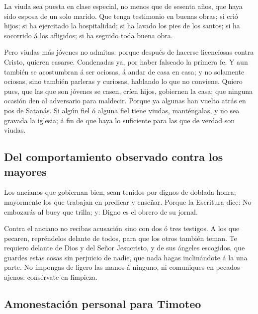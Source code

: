  La viuda sea puesta en clase especial, no menos que de
sesenta años, que haya sido esposa de un solo marido. 
Que tenga testimonio en buenas obras; si crió hijos; si ha ejercitado la
hospitalidad; si ha lavado los pies de los santos; si ha socorrido á los
afligidos; si ha seguido toda buena obra.

 Pero viudas más jóvenes no admitas: porque después de
hacerse licenciosas contra Cristo, quieren casarse. 
Condenadas ya, por haber falseado la primera fe.  Y aun
también se acostumbran á ser ociosas, á andar de casa en casa; y no
solamente ociosas, sino también parleras y curiosas, hablando lo que no
conviene.  Quiero pues, que las que son jóvenes se casen,
críen hijos, gobiernen la casa; que ninguna ocasión den al adversario
para maldecir.  Porque ya algunas han vuelto atrás en pos
de Satanás.  Si algún fiel ó alguna fiel tiene viudas,
manténgalas, y no sea gravada la iglesia; á fin de que haya lo
suficiente para las que de verdad son viudas.

\hypertarget{del-comportamiento-observado-contra-los-mayores}{%
\subsection{Del comportamiento observado contra los
mayores}\label{del-comportamiento-observado-contra-los-mayores}}

 Los ancianos que gobiernan bien, sean tenidos por dignos
de doblada honra; mayormente los que trabajan en predicar y enseñar.
 Porque la Escritura dice: No embozarás al buey que
trilla; y: Digno es el obrero de su jornal.

 Contra el anciano no recibas acusación sino con dos ó
tres testigos.  A los que pecaren, repréndelos delante de
todos, para que los otros también teman.  Te requiero
delante de Dios y del Señor Jesucristo, y de sus ángeles escogidos, que
guardes estas cosas sin perjuicio de nadie, que nada hagas inclinándote
á la una parte.  No impongas de ligero las manos á
ninguno, ni comuniques en pecados ajenos: consérvate en limpieza.

\hypertarget{amonestaciuxf3n-personal-para-timoteo}{%
\subsection{Amonestación personal para
Timoteo}\label{amonestaciuxf3n-personal-para-timoteo}}

